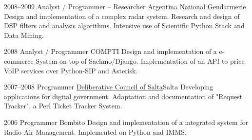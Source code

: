 \documentclass[11pt,a4paper]{moderncv}
\begin{document}
    \cventry
        {2008--2009}
        {Analyst / Programmer -- Researcher}
        {\href{http://www.gendarmeria.gov.ar}{Argentina National Gendarmerie}} {} {}
        {
            Design and implementation of a complex radar system. Research and                                     %
                design of DSP filters and analysis algorithms.                                                    %
            Intensive use of Scientific Python Stack and Data Mining.                                             %
        }

    \cventry                                                                                                      %
        {2008}                                                                                                    %
        {Analyst / Programmer}                                                                                    %
        {COMPTI} {} {}                                                                                            %
        {                                                                                                         %
            Design and implementation of a e-commerce System on top of                                            %
            Sachmo/Django.                                                                                        %
            Implementation of an API to price VoIP services over Python-SIP and                                   %
            Asterisk.                                                                                             %
        }                                                                                                         %

    \cventry
        {2007--2008}
        {Programmer}
        {\href{http://softwarelibre.unsa.edu.ar/dsa/}{Deliberative Council of Salta}}{Salta}{}
        {
            Developing applications for digital government. Adaptation and                                        %
                documentation of "Request Tracker", a Perl Ticket Tracker                                         %
                System.                                                                                           %
        }

    \cventry
        {2006}
        {Programmer}
        {Bombito} {} {}
        {
            Design and implementation of a integrated system for Radio Air                                        %
            Management.                                                                                           %
            Implemented on Python and IMMS.                                                                       %
        }
\end{document}
